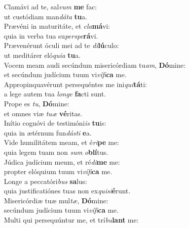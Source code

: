 \evenverse Clamávi ad te, sal\textit{vum} \textbf{me} fac:~\*\\
\evenverse ut custódiam man\textit{dá}\textit{ta} \textbf{tu}a.\\
\oddverse Prævéni in maturitáte, et \textit{cla}\textbf{má}vi:~\*\\
\oddverse quia in verba tua su\textit{per}\textit{spe}\textbf{rá}vi.\\
\evenverse Prævenérunt óculi mei ad te \textit{di}\textbf{lú}culo:~\*\\
\evenverse ut meditárer eló\textit{qui}\textit{a} \textbf{tu}a.\\
\oddverse Vocem meam audi secúndum misericórdiam tu\textit{am}, \textbf{Dó}mine:~\*\\
\oddverse et secúndum judícium tuum vi\textit{ví}\textit{fi}\textbf{ca} me.\\
\evenverse Appropinquavérunt persequéntes me ini\textit{qui}\textbf{tá}ti:~\*\\
\evenverse a lege autem tua \textit{lon}\textit{ge} \textbf{fa}cti sunt.\\
\oddverse Prope es \textit{tu}, \textbf{Dó}mine:~\*\\
\oddverse et omnes viæ \textit{tu}\textit{æ} \textbf{vé}ritas.\\
\evenverse Inítio cognóvi de testimóni\textit{is} \textbf{tu}is:~\*\\
\evenverse quia in ætérnum fun\textit{dá}\textit{sti} \textbf{e}a.\\
\oddverse Vide humilitátem meam, et é\textit{ri}\textbf{pe} me:~\*\\
\oddverse quia legem tuam non \textit{sum} \textit{o}\textbf{blí}tus.\\
\evenverse Júdica judícium meum, et ré\textit{di}\textbf{me} me:~\*\\
\evenverse propter elóquium tuum vi\textit{ví}\textit{fi}\textbf{ca} me.\\
\oddverse Longe a peccatóri\textit{bus} \textbf{sa}lus:~\*\\
\oddverse quia justificatiónes tuas non ex\textit{qui}\textit{si}\textbf{é}runt.\\
\evenverse Misericórdiæ tuæ mul\textit{tæ}, \textbf{Dó}mine:~\*\\
\evenverse secúndum judícium tuum vi\textit{ví}\textit{fi}\textbf{ca} me.\\
\oddverse Multi qui persequúntur me, et trí\textit{bu}\textbf{lant} me:~\*\\

